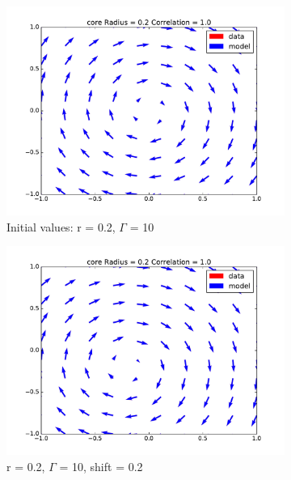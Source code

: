 \documentclass[12pt, a4paper, openany]{memoir}
\begin{document}
\begin{figure}[h!]
	\centering
	\begin{subfigure}[b]{0.45\textwidth}
		\centering
		\includegraphics[trim=40 20 40 20 ,clip, width=\textwidth]{figure/test_02_10.pdf}
		\caption{Initial values: r = 0.2, $\Gamma$ = 10}
	\end{subfigure}
	\begin{subfigure}[b]{0.45\textwidth}
		\centering
		\includegraphics[trim=40 20 40 20 ,clip, width=\textwidth]{figure/test_02_10_02.pdf}
		\caption{r = 0.2, $\Gamma$ = 10, shift = 0.2}
	\end{subfigure}
	\begin{subfigure}[b]{0.45\textwidth}
		\centering

\end{subfigure}
\end{figure}
\end{document}
